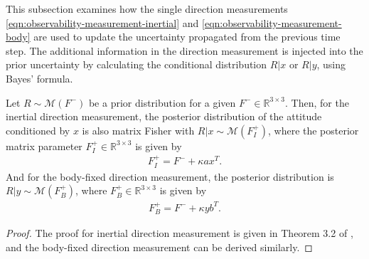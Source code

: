 This subsection examines how the single direction measurements \eqref{eqn:observability-measurement-inertial} and \eqref{eqn:observability-measurement-body} are used to update the uncertainty propagated from the previous time step.
The additional information in the direction measurement is injected into the prior uncertainty by calculating the conditional distribution $R|x$ or $R|y$, using Bayes' formula. 
\begin{theorem} \label{thm:F_post}
	Let $R\sim\mathcal{M}(F^-)$ be a prior distribution for a given $F^-\in\mathbb{R}^{3\times 3}$.
	Then, for the inertial direction measurement, the posterior distribution of the attitude conditioned by $x$ is also matrix Fisher with $R|x \sim \mathcal{M}(F_I^+)$, where the posterior matrix parameter $F_I^+\in\mathbb{R}^{3\times 3}$ is given by
	\begin{align}
		F_I^+ = F^- + \kappa a x^T.\label{eqn:observability-measurement-F_I}
	\end{align}
	And for the body-fixed direction measurement, the posterior distribution is $R|y \sim \mathcal{M}(F_B^+)$, where $F_B^+\in\mathbb{R}^{3\times 3}$ is given by
	\begin{align}
		F_B^+ = F^- + \kappa y b^T.\label{eqn:observability-measurement-F_B}
	\end{align}
\end{theorem}
\begin{proof}
	The proof for inertial direction measurement is given in Theorem 3.2 of \cite{lee2018bayesian}, and the body-fixed direction measurement can be derived similarly.
\end{proof}


